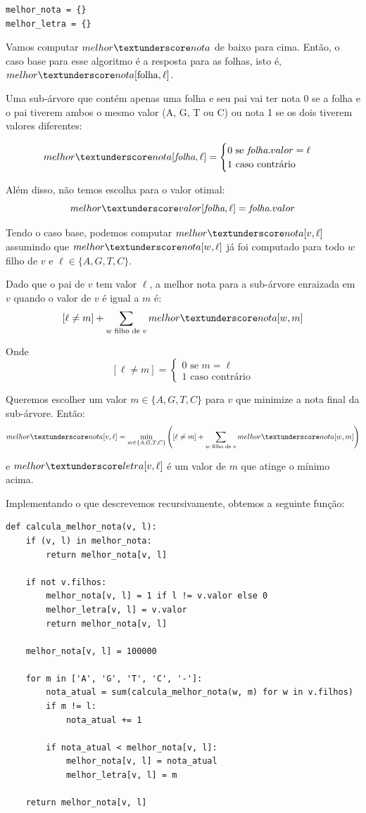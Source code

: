 \documentclass[11pt]{article}
\newcommand{\tu}{\textunderscore}
\begin{document}
\begin{verbatim}
melhor_nota = {}
melhor_letra = {}
\end{verbatim}

Vamos computar $melhor \tu nota$ de baixo para cima. Então, o caso base
para esse algoritmo é a resposta para as folhas, isto é, $melhor\tu nota[\mathrm{folha}, \ell]$.

Uma sub-árvore que contém apenas uma folha e seu pai vai ter
nota 0 se a folha e o pai tiverem ambos o mesmo valor (A,
G, T ou C) ou nota 1 se os dois tiverem valores diferentes:

\[melhor \tu nota[\textit{folha}, \ell] = \begin{cases}0 \text{ se } \textit{folha}.valor = \ell \\
                                                       1 \text{ caso contrário}\end{cases}\]

Além disso, não temos escolha para o valor otimal:
\[ melhor \tu valor[\textit{folha}, \ell] = \textit{folha}.valor \]

Tendo o caso base, podemos computar $melhor \tu nota[v, \ell]$
assumindo que $melhor \tu nota[w, \ell]$ já foi computado para todo
$w$ filho de $v$ e $\ell \in \{A, G, T, C\}$.

Dado que o pai de $v$ tem valor $\ell$, a melhor nota para a
sub-árvore enraizada em $v$ quando o valor de $v$ é igual a $m$ é:
\[ [\ell \neq m] + \sum_{w \text{ filho de }v} melhor \tu nota[w, m]\]

Onde \[[\ell \neq m] =  \begin{cases} 0 \text{ se } m = \ell \\
                                      1 \text{ caso contrário}\end{cases}\]

Queremos escolher um valor $m \in \{A, G, T, C\}$ para $v$
que minimize a nota final da sub-árvore. Então:
\[melhor \tu nota[v, \ell] = \min_{m \in \{A, G, T, C\}} \left([\ell
\neq m] + \sum_{w \text{ filho de }v} melhor \tu nota[w, m]\right)\]

e $melhor\tu letra[v, \ell]$ é um valor de $m$ que atinge o mínimo
acima.

Implementando o que descrevemos recursivamente, obtemos a seguinte
função:
\begin{verbatim}
def calcula_melhor_nota(v, l):
    if (v, l) in melhor_nota:
        return melhor_nota[v, l]

    if not v.filhos:
        melhor_nota[v, l] = 1 if l != v.valor else 0
        melhor_letra[v, l] = v.valor
        return melhor_nota[v, l]

    melhor_nota[v, l] = 100000

    for m in ['A', 'G', 'T', 'C', '-']:
        nota_atual = sum(calcula_melhor_nota(w, m) for w in v.filhos)
        if m != l:
            nota_atual += 1

        if nota_atual < melhor_nota[v, l]:
            melhor_nota[v, l] = nota_atual
            melhor_letra[v, l] = m

    return melhor_nota[v, l]
\end{verbatim}
\end{document}

